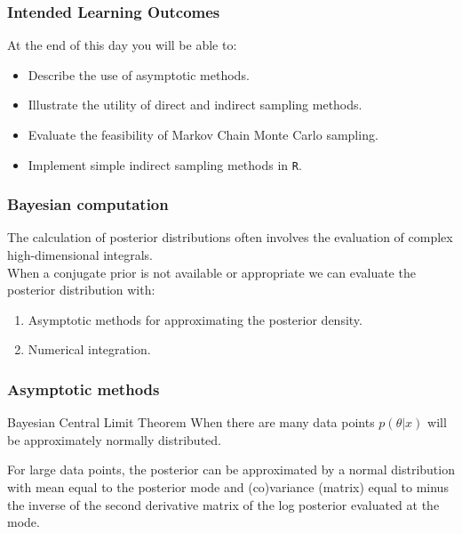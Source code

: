 \documentclass{beamer}
\newcommand{\1}{\ensuremath{\mathbf{1}}}
\begin{document}
%
%
%
\begin{frame}\frametitle{Intended Learning Outcomes}
	At the end of this day you will be able to:
	\begin{itemize}
		\item Describe the use of asymptotic methods.
		\item Illustrate the utility of direct and indirect sampling methods.
		\item Evaluate the feasibility of Markov Chain Monte Carlo sampling.
		\item Implement simple indirect sampling methods in \texttt{R}.
	\end{itemize}
\end{frame}
%
%
%
\begin{frame}\frametitle{Bayesian computation}
	The calculation of posterior distributions often involves the evaluation of complex high-dimensional integrals.\\[2ex]
	When a conjugate prior is not available or appropriate we can evaluate the posterior distribution with:
	\begin{enumerate}
		\item Asymptotic methods for approximating the posterior density.
		\item Numerical integration.
	\end{enumerate}
\end{frame}
%
%
%
\begin{frame}\frametitle{Asymptotic methods}
	\begin{block}{Bayesian Central Limit Theorem}
		When there are many data points $p(\theta|x)$ will be approximately normally distributed.
	\end{block}
	For large data points, the posterior can be approximated by a normal distribution with mean equal to the posterior mode and (co)variance (matrix) equal to minus the inverse of the second derivative matrix of the log posterior evaluated at the mode.
\end{frame}
\end{document}
